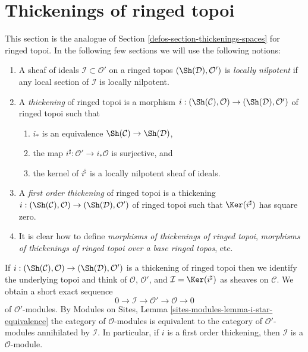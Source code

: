 \section{Thickenings of ringed topoi}
\label{defos-section-thickenings-ringed-topoi}
This section is the analogue of Section \ref{defos-section-thickenings-spaces}
for ringed topoi.
In the following few sections we will use the following notions:
\begin{enumerate}
\item A sheaf of ideals $\mathcal{I} \subset \mathcal{O}'$ on
a ringed topos $(\Sh(\mathcal{D}), \mathcal{O}')$ is {\it locally nilpotent}
if any local section of $\mathcal{I}$ is locally nilpotent.
\item A {\it thickening} of ringed topoi is a morphism
$i : (\Sh(\mathcal{C}), \mathcal{O}) \to (\Sh(\mathcal{D}), \mathcal{O}')$
of ringed topoi such that
\begin{enumerate}
\item $i_*$ is an equivalence $\Sh(\mathcal{C}) \to \Sh(\mathcal{D})$,
\item the map $i^\sharp : \mathcal{O}' \to i_*\mathcal{O}$
is surjective, and
\item the kernel of $i^\sharp$ is a locally nilpotent sheaf of ideals.
\end{enumerate}
\item A {\it first order thickening} of ringed topoi is a thickening
$i : (\Sh(\mathcal{C}), \mathcal{O}) \to (\Sh(\mathcal{D}), \mathcal{O}')$
of ringed topoi such that $\Ker(i^\sharp)$ has square zero.
\item It is clear how to define
{\it morphisms of thickenings of ringed topoi},
{\it morphisms of thickenings of ringed topoi over a base ringed topos}, etc.
\end{enumerate}
If
$i : (\Sh(\mathcal{C}), \mathcal{O}) \to (\Sh(\mathcal{D}), \mathcal{O}')$
is a thickening of ringed topoi then we identify the underlying topoi
and think of $\mathcal{O}$, $\mathcal{O}'$, and
$\mathcal{I} = \Ker(i^\sharp)$ as sheaves on $\mathcal{C}$.
We obtain a short exact sequence
$$
0 \to \mathcal{I} \to \mathcal{O}' \to \mathcal{O} \to 0
$$
of $\mathcal{O}'$-modules. By
Modules on Sites, Lemma \ref{sites-modules-lemma-i-star-equivalence}
the category of $\mathcal{O}$-modules is equivalent to the category
of $\mathcal{O}'$-modules annihilated by $\mathcal{I}$. In particular,
if $i$ is a first order thickening, then
$\mathcal{I}$ is a $\mathcal{O}$-module.

